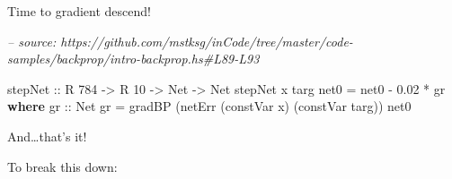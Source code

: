\documentclass[]{article}
\newenvironment{Shaded}{}{}
\newcommand{\CommentTok}[1]{\textcolor[rgb]{0.38,0.63,0.69}{\textit{#1}}}
\newcommand{\DataTypeTok}[1]{\textcolor[rgb]{0.56,0.13,0.00}{#1}}
\newcommand{\DecValTok}[1]{\textcolor[rgb]{0.25,0.63,0.44}{#1}}
\newcommand{\FloatTok}[1]{\textcolor[rgb]{0.25,0.63,0.44}{#1}}
\newcommand{\FunctionTok}[1]{\textcolor[rgb]{0.02,0.16,0.49}{#1}}
\newcommand{\KeywordTok}[1]{\textcolor[rgb]{0.00,0.44,0.13}{\textbf{#1}}}
\newcommand{\NormalTok}[1]{#1}
\newcommand{\OtherTok}[1]{\textcolor[rgb]{0.00,0.44,0.13}{#1}}
\begin{document}
Time to gradient descend!

\begin{Shaded}
\begin{Highlighting}[]
\CommentTok{-- source: https://github.com/mstksg/inCode/tree/master/code-samples/backprop/intro-backprop.hs#L89-L93}

\OtherTok{stepNet ::} \DataTypeTok{R} \DecValTok{784} \OtherTok{->} \DataTypeTok{R} \DecValTok{10} \OtherTok{->} \DataTypeTok{Net} \OtherTok{->} \DataTypeTok{Net}
\NormalTok{stepNet x targ net0 }\FunctionTok{=}\NormalTok{ net0 }\FunctionTok{-} \FloatTok{0.02} \FunctionTok{*}\NormalTok{ gr}
  \KeywordTok{where}
\OtherTok{    gr ::} \DataTypeTok{Net}
\NormalTok{    gr }\FunctionTok{=}\NormalTok{ gradBP (netErr (constVar x) (constVar targ)) net0}
\end{Highlighting}
\end{Shaded}

And\ldots{}that's it!

To break this down:
\end{document}
